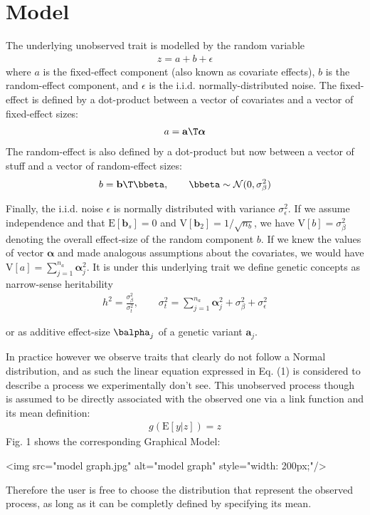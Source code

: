 \section{Model}

The underlying unobserved trait is modelled by the random variable
\begin{align*}
  z = a + b + \epsilon
\end{align*}
where $a$ is the fixed-effect component (also known as covariate effects), $b$ is the random-effect component, and $\epsilon$ is the i.i.d. normally-distributed noise. The fixed-effect is defined by a dot-product between a vector of covariates and a vector of fixed-effect sizes:
\begin{align*}
  a = \mathbf a\T \boldsymbol\alpha
\end{align*}
The random-effect is also defined by a dot-product but now between a vector of stuff and a vector of random-effect sizes:
\begin{align*}
  b = \mathbf b\T \bbeta, \qquad \bbeta \sim \mathcal N(0, \sigma^2_{\beta})
\end{align*}

Finally, the i.i.d. noise $\epsilon$ is normally distributed with variance $\sigma^2_{\epsilon}$. If we assume independence and that $\mathrm E[\mathbf b_s] = 0$ and $\mathrm V[\mathbf b_2]=1/\sqrt{n_b}$, we have $\mathrm V[b] = \sigma^2_{\beta}$ denoting the overall effect-size of the random component $b$. If we knew the values of vector $\boldsymbol\alpha$  and made analogous assumptions about the covariates, we would have $\mathrm V[a]  = \sum_{j=1}^{n_a} \boldsymbol \alpha_j^2$. It is under this underlying trait we define genetic concepts as narrow-sense heritability
\begin{align*}
  h^2=\frac{\sigma^2_{\beta}}{\sigma_t^2}, \qquad \sigma_t^2 = \sum_{j=1}^{n_a} \boldsymbol \alpha_j^2 + \sigma^2_{\beta} + \sigma^2_{\epsilon}
\end{align*}

or as additive effect-size $\balpha_j$ of a genetic variant $\mathbf a_j$.

In practice however we observe traits that clearly do not follow a Normal distribution, and as such the linear equation expressed in Eq. (1) is considered to describe a process we experimentally don't see. This unobserved process though is assumed to be directly associated with the observed one via a link function and its mean definition:
\begin{align*}
  g(\mathrm E[y|z]) = z
\end{align*}
Fig. 1 shows the corresponding Graphical Model:

<img src="model graph.jpg" alt="model graph" style="width: 200px;"/>

Therefore the user is free to choose the distribution that represent the observed process, as long as it can be completly defined by specifying its mean.
